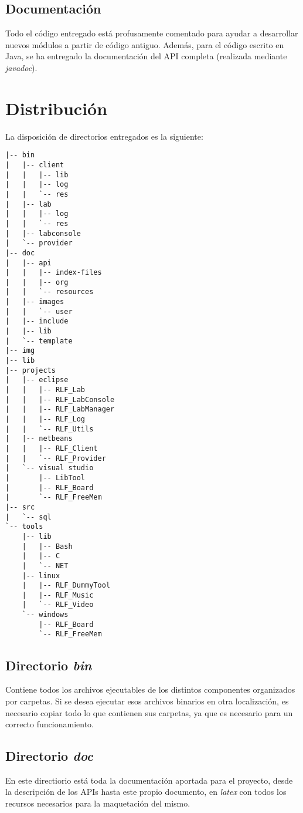 \subsection*{Documentación}
Todo el código entregado está profusamente comentado para ayudar a 
desarrollar nuevos módulos a partir de código antiguo. Además, para 
el código escrito en Java, se ha entregado la documentación del API 
completa (realizada mediante \emph{javadoc}).

\clearpage

\section*{Distribución}
La disposición de directorios entregados es la siguiente:
\begin{verbatim}
|-- bin
|   |-- client
|   |   |-- lib
|   |   |-- log
|   |   `-- res
|   |-- lab
|   |   |-- log
|   |   `-- res
|   |-- labconsole
|   `-- provider
|-- doc
|   |-- api
|   |   |-- index-files
|   |   |-- org
|   |   `-- resources
|   |-- images
|   |   `-- user
|   |-- include
|   |-- lib
|   `-- template
|-- img
|-- lib
|-- projects
|   |-- eclipse
|   |   |-- RLF_Lab
|   |   |-- RLF_LabConsole
|   |   |-- RLF_LabManager
|   |   |-- RLF_Log
|   |   `-- RLF_Utils
|   |-- netbeans
|   |   |-- RLF_Client
|   |   `-- RLF_Provider
|   `-- visual studio
|       |-- LibTool
|       |-- RLF_Board
|       `-- RLF_FreeMem
|-- src
|   `-- sql
`-- tools
    |-- lib
    |   |-- Bash
    |   |-- C
    |   `-- NET
    |-- linux
    |   |-- RLF_DummyTool
    |   |-- RLF_Music
    |   `-- RLF_Video
    `-- windows
        |-- RLF_Board
        `-- RLF_FreeMem
\end{verbatim}

\clearpage

\subsection*{Directorio \emph{bin}}
Contiene todos los archivos ejecutables de los distintos componentes 
organizados por carpetas. Si se desea ejecutar esos archivos binarios 
en otra localización, es necesario copiar todo lo que contienen sus 
carpetas, ya que es necesario para un correcto funcionamiento.

\subsection*{Directorio \emph{doc}}
En este directiorio está toda la documentación aportada para el 
proyecto, desde la descripción de los APIs hasta este propio 
documento, en \emph{latex} con todos los recursos necesarios para la 
maquetación del mismo.

